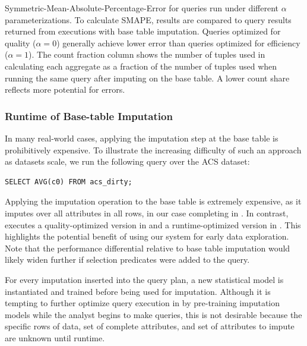 \begin{table}
\centering

\caption{Symmetric-Mean-Absolute-Percentage-Error for queries run under different $\alpha$
    parameterizations. To calculate SMAPE, \ProjectName{} results are compared to query results returned
    from executions with base table imputation. Queries optimized
    for quality ($\alpha=0$) generally achieve lower error than queries optimized for
    efficiency ($\alpha=1$). The count fraction column shows the number of tuples used in calculating each aggregate
     as a fraction of the number of tuples used when running the same query after imputing on the base table.
    A lower count share reflects more potential for errors.}
\label{table:smape}
\end{table}


\subsubsection{Runtime of Base-table Imputation}
In many real-world cases, applying the imputation step at the base table is prohibitively
expensive.
To illustrate the increasing difficulty of such an approach as datasets scale, we run the following query over the ACS dataset:
\begin{lstlisting}[breaklines]
SELECT AVG(c0) FROM acs_dirty;
\end{lstlisting}
Applying the imputation operation to the base table is extremely expensive, as it imputes over all attributes in all rows, in our case
completing in \acsbaseresultminutes{}. In contrast, \ProjectName{} executes a quality-optimized version
in \acsimputedbzeroresult{} and a runtime-optimized version in \acsimputedboneresult{}. This highlights the potential
benefit of using our system for early data exploration. Note that the performance differential relative to base table imputation
would likely widen further if selection predicates were added to the query.

For every imputation inserted into the query plan, a new statistical model is instantiated and trained before being used for imputation.
Although it is tempting to further optimize query execution in \ProjectName{} by pre-training imputation models while the analyst begins to make queries,
this is not desirable because the specific rows of data, set of complete attributes, and set of attributes to impute are unknown until runtime.



